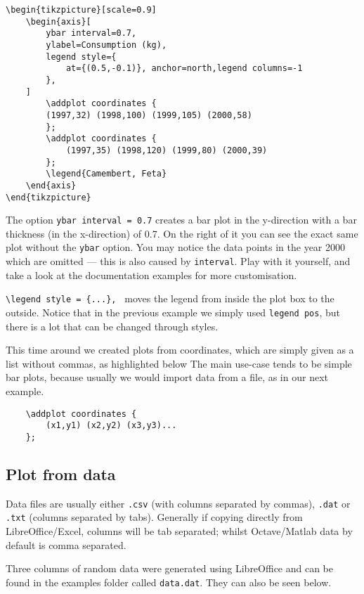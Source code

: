 \begin{lstlisting}
\begin{tikzpicture}[scale=0.9]
    \begin{axis}[
        ybar interval=0.7,
        ylabel=Consumption (kg),
        legend style={
            at={(0.5,-0.1)}, anchor=north,legend columns=-1
        },
    ]
        \addplot coordinates {
        (1997,32) (1998,100) (1999,105) (2000,58) 
        };
        \addplot coordinates {
            (1997,35) (1998,120) (1999,80) (2000,39) 
        };
        \legend{Camembert, Feta}
    \end{axis}
\end{tikzpicture}
\end{lstlisting}
The option \verb|ybar interval = 0.7| creates a bar plot in the y-direction with a bar thickness (in the x-direction) of 0.7.
On the right of it you can see the exact same plot without the \verb|ybar| option.
You may notice the data points in the year 2000 which are omitted --- this is also caused by \verb|interval|.
Play with it yourself, and take a look at the documentation examples for more customisation.

\verb|\legend style = {...}, | moves the legend from inside the plot box to the outside.
Notice that in the previous example we simply used \verb|legend pos|, but there is a lot that can be changed through styles.

This time around we created plots from coordinates, which are simply given as a list without commas, as highlighted below
The main use-case tends to be simple bar plots, because usually we would import data from a file, as in our next example.
\begin{lstlisting}
    \addplot coordinates {
        (x1,y1) (x2,y2) (x3,y3)...
    };
\end{lstlisting}

\subsection{Plot from data}
Data files are usually either \texttt{.csv} (with columns separated by commas), \texttt{.dat} or \texttt{.txt} (columns separated by tabs).
Generally if copying directly from LibreOffice/Excel, columns will be tab separated; whilst Octave/Matlab data by default is comma separated.

Three columns of random data were generated using LibreOffice and can be found in the examples folder called \texttt{data.dat}. They can also be seen below.



